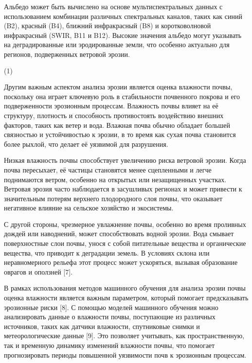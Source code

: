 Альбедо может быть вычислено на основе мультиспектральных данных с
использованием комбинации различных спектральных каналов, таких как
синий (B2), красный (B4), ближний инфракрасный (B8) и коротковолновой
инфракрасный (SWIR, B11 и B12). Высокие значения альбедо могут указывать
на деградированные или эродированные земли, что особенно актуально для
регионов, подверженных ветровой эрозии.

(1)

Другим важным аспектом анализа эрозии является оценка влажности почвы,
поскольку она играет ключевую роль в стабильности почвенного покрова и
его подверженности эрозионным процессам. Влажность почвы влияет на её
структуру, плотность и способность противостоять воздействию внешних
факторов, таких как ветер и вода. Влажная почва обычно обладает большей
связностью и устойчивостью к эрозии, в то время как сухая почва
становится более рыхлой, что делает её уязвимой для разрушения.

Низкая влажность почвы способствует увеличению риска ветровой эрозии.
Когда почва пересыхает, её частицы становятся менее сцепленными и легче
поднимаются ветром, особенно на открытых или незащищенных участках.
Ветровая эрозия часто наблюдается в засушливых регионах и может привести
к значительным потерям верхнего плодородного слоя почвы, что оказывает
негативное влияние на сельское хозяйство и экосистемы.

С другой стороны, чрезмерное увлажнение почвы, особенно во время
проливных дождей или наводнений, может способствовать водной эрозии.
Вода смывает поверхностные слои почвы, унося с собой питательные
вещества и органические вещества, что приводит к деградации земель. В
условиях склона или неравномерного рельефа этот процесс может
ускоряться, вызывая образование оврагов и оползней {[}7{]}.

В рамках использования методов машинного обучения для анализа эрозии
почвы оценка влажности является важным параметром, который помогает
предсказывать эрозионные риски {[}8{]}. С помощью моделей машинного
обучения можно анализировать данные о влажности почвы, поступающие из
различных источников, таких как датчики влажности, спутниковые снимки и
метеорологические данные {[}9{]}. Это позволяет учитывать, как
пространственную, так и временную динамику изменений влажности почвы,
что помогает прогнозировать периоды повышенной уязвимости почв к
эрозионным процессам.

